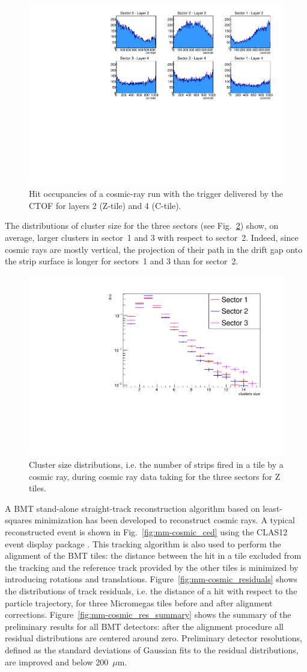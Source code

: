 \begin{figure}[htb]
 \includegraphics[width=.45\textwidth]{images/BMT_hit_cosmics_CTOFtrigger.pdf}
 \caption{Hit occupancies of a cosmic-ray run with the trigger delivered by the CTOF for layers 2 (Z-tile) and 4 (C-tile). }
 \label{fig:mm-cosmic_occupancy}
\end{figure}

The distributions of cluster size for the three sectors (see Fig.~\ref{fig:mm-cosmic_cls}) show, on average, larger clusters in
sector~1 and 3 with respect to sector~2. Indeed, since cosmic rays are mostly vertical, the projection of their path in the drift
gap onto the strip surface is longer for sectors~1 and 3 than for sector~2.

\begin{figure}[htb]
 \includegraphics[width=.45\textwidth]{images/cosmic_cluster_size.pdf}
 \caption{Cluster size distributions, i.e. the number of strips fired in a tile by a cosmic ray, during cosmic ray data taking for the three sectors for Z tiles.}
 \label{fig:mm-cosmic_cls}
\end{figure}

A BMT stand-alone straight-track reconstruction algorithm based on least-squares minimization has been developed to reconstruct
cosmic rays. A typical reconstructed event is shown in Fig.~\ref{fig:mm-cosmic_ced} using the CLAS12 event display package
\cite{recon-nim}. This tracking algorithm is also used to perform the alignment of the BMT tiles: the distance between 
the hit in a
tile excluded from the tracking and the reference track provided by the other tiles is minimized by introducing rotations and
translations. Figure~\ref{fig:mm-cosmic_residuals} shows the distributions of track residuals, i.e. the distance of a hit with
respect to the particle trajectory, for three Micromegas tiles before and after alignment corrections.
Figure~\ref{fig:mm-cosmic_res_summary} shows the summary of the preliminary results for all BMT detectors: after the
alignment procedure all residual distributions are centered around zero. Preliminary detector resolutions, defined as the standard
deviations of Gaussian fits to the residual distributions, are improved and below 200~$\mu$m. 


